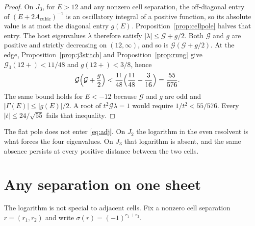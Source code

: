 \begin{proof}
On \(J_3\), for \(E>12\) and any nonzero cell separation, the off-diagonal
entry of \((E+2A_{\mathrm{cubic}})^{-1}\) is an oscillatory integral of a
positive function, so its absolute value is at most the diagonal entry
\(g(E)\).
Proposition~\ref{prop:cellpole} halves that entry.
The host eigenvalues \(\lambda\) therefore satisfy
\(|\lambda|\le\mathcal{G}+g/2\).
Both \(\mathcal{G}\) and \(g\) are positive and strictly decreasing on
\((12,\infty)\), and so is \(\mathcal{G}(\mathcal{G}+g/2)\).
At the edge, Proposition~\ref{prop:j3stitch} and
Proposition~\ref{prop:rung} give
\(\mathcal{G}_3(12+)<11/48\) and \(g(12+)<3/8\), hence
\[
\mathcal{G}\Bigl(\mathcal{G}+\frac g2\Bigr)
<\frac{11}{48}\Bigl(\frac{11}{48}+\frac{3}{16}\Bigr)
=\frac{55}{576}.
\]
The same bound holds for \(E<-12\) because \(\mathcal{G}\) and \(g\) are odd
and \(|\Gamma(E)|\le |g(E)|/2\).
A root of \(t^2\mathcal{G}\lambda=1\) would require
\(1/t^2<55/576\).
Every \(|t|\le 24/\sqrt{55}\) fails that inequality.
\end{proof}

The flat pole does not enter \eqref{eq:adj}.
On \(J_2\) the logarithm in the even resolvent is what forces the four
eigenvalues.
On \(J_3\) that logarithm is absent, and the same absence persists at every
positive distance between the two cells.

\section{Any separation on one sheet}
\label{sec:anysep}

The logarithm is not special to adjacent cells.
Fix a nonzero cell separation \(r=(r_1,r_2)\) and write
\(\sigma(r)=(-1)^{r_1+r_2}\).

